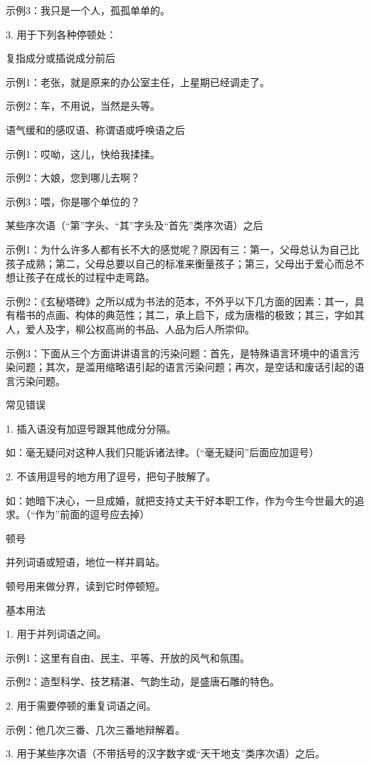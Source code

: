 示例3：我只是一个人，孤孤单单的。

3. 用于下列各种停顿处：

复指成分或插说成分前后

示例1：老张，就是原来的办公室主任，上星期已经调走了。

示例2：车，不用说，当然是头等。

语气缓和的感叹语、称谓语或呼唤语之后

示例1：哎呦，这儿，快给我揉揉。

示例2：大娘，您到哪儿去啊？

示例3：喂，你是哪个单位的？

某些序次语（“第”字头、“其”字头及“首先”类序次语）之后

示例1：为什么许多人都有长不大的感觉呢？原因有三：第一，父母总认为自己比孩子成熟；第二，父母总要以自己的标准来衡量孩子；第三，父母出于爱心而总不想让孩子在成长的过程中走弯路。

示例2：《玄秘塔碑》之所以成为书法的范本，不外乎以下几方面的因素：其一，具有楷书的点画、构体的典范性；其二，承上启下，成为唐楷的极致；其三，字如其人，爱人及字，柳公权高尚的书品、人品为后人所崇仰。

示例3：下面从三个方面讲讲语言的污染问题：首先，是特殊语言环境中的语言污染问题；其次，是滥用缩略语引起的语言污染问题；再次，是空话和废话引起的语言污染问题。

常见错误

1. 插入语没有加逗号跟其他成分分隔。

如：毫无疑问对这种人我们只能诉诸法律。（“毫无疑问”后面应加逗号）

2. 不该用逗号的地方用了逗号，把句子肢解了。

如：她暗下决心，一旦成婚，就把支持丈夫干好本职工作，作为今生今世最大的追求。（“作为”前面的逗号应去掉）

顿号

并列词语或短语，地位一样并肩站。

顿号用来做分界，读到它时停顿短。

基本用法

1. 用于并列词语之间。

示例1：这里有自由、民主、平等、开放的风气和氛围。

示例2：造型科学、技艺精湛、气韵生动，是盛唐石雕的特色。

2. 用于需要停顿的重复词语之间。

示例：他几次三番、几次三番地辩解着。

3. 用于某些序次语（不带括号的汉字数字或“天干地支”类序次语）之后。

